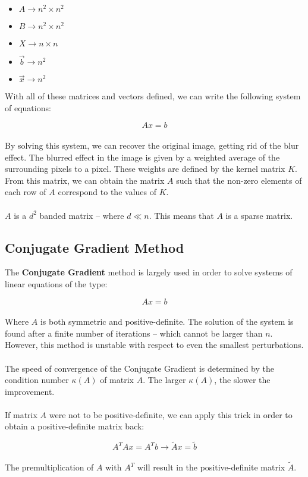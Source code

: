 \documentclass{article}
\begin{document}
\begin{itemize}
	\item $A \rightarrow n^2 \times n^2$
	\item $B \rightarrow n^2 \times n^2$
	\item $X \rightarrow n \times n$
	\item $\overrightarrow{b} \rightarrow n^2$
	\item $\overrightarrow{x} \rightarrow n^2$
\end{itemize}
With all of these matrices and vectors defined, we can write the following system of equations:

\[ Ax = b \] \\
By solving this system, we can recover the original image, getting rid of the blur effect. The blurred effect in the image is given by a weighted average of the surrounding pixels to a pixel. These weights are defined by the kernel matrix $K$. From this matrix, we can obtain the matrix $A$ such that the non-zero elements of each row of $A$ correspond to the values of $K$. \\ \\
$A$ is a $d^2$ banded matrix -- where $d \ll n$. This means that $A$ is a sparse matrix.

\subsection{Conjugate Gradient Method}
The \textbf{Conjugate Gradient} method is largely used in order to solve systems of linear equations of the type:

\[ Ax = b \] \\
Where $A$ is both symmetric and positive-definite. The solution of the system is found after a finite number of iterations -- which cannot be larger than $n$. However, this method is unstable with respect to even the smallest perturbations. \\ \\
The speed of convergence of the Conjugate Gradient is determined by the condition number $\kappa(A)$ of matrix $A$. The larger $\kappa(A)$, the slower the improvement. \\ \\
If matrix $A$ were not to be positive-definite, we can apply this trick in order to obtain a positive-definite matrix back:

\[ A^TAx = A^Tb \rightarrow \tilde{A}x = \tilde{b} \] \\
The premultiplication of $A$ with $A^T$ will result in the positive-definite matrix $\tilde{A}$.
\end{document}
